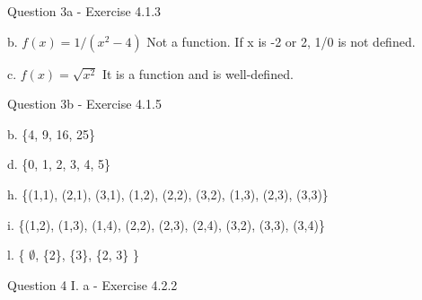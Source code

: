 \documentclass[OPONE]{example}
\begin{document}

\noindent Question 3a - Exercise 4.1.3
\begin{list}{}{}
	
	\item {b.}  
	$f(x) = 1/(x^2-4)$ \hspace{.1 in}
	Not a function. If x is -2 or 2, 1/0 is not defined.

	\item{c.}  
	$f(x) = \sqrt{x^2}$ \hspace{.5 in}
	It is a function and is well-defined.
	

\end{list}

\noindent Question 3b - Exercise 4.1.5

	
\begin{list}{}{}
	
	\item{b.}	
	\{4, 9, 16, 25\}

	\item{d.}
	\{0, 1, 2, 3, 4, 5\}

	\item{h.}	
	\{(1,1), (2,1), (3,1), (1,2), (2,2), (3,2), (1,3), (2,3), (3,3)\}
	
	\item{i.}	
	\{(1,2), (1,3), (1,4), (2,2), (2,3), (2,4), (3,2), (3,3), (3,4)\}
	
	\item{l.}	
	\{ $\emptyset$, \{2\}, \{3\}, \{2, 3\} \}
	
\end{list}


\newpage
\noindent Question 4 I. a - Exercise 4.2.2
\end{document}
